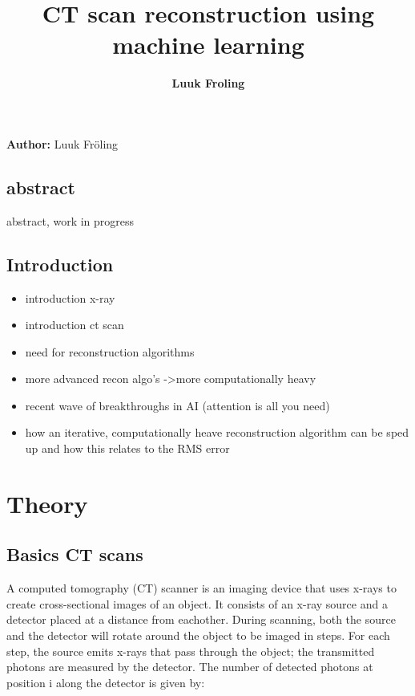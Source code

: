 \documentclass{article}
\title{CT scan reconstruction using machine learning}
\date{\displaydate{articleDate}}
\author{\bfseries Luuk Froling\mdseries\\}
\begin{document}
\maketitle
{}

\textbf{Author:} Luuk Fröling

\subsection{abstract}

abstract, work in progress

\subsection{Introduction}

\begin{itemize}
\item introduction x-ray
\item introduction ct scan
\item need for reconstruction algorithms
\item more advanced recon algo's -\textgreater  more computationally heavy
\item recent wave of breakthroughs in AI (attention is all you need)
\item how an iterative, computationally heave reconstruction algorithm can be sped up and how this relates to the RMS error
\end{itemize}

\section{Theory}

\subsection{Basics CT scans}

A computed tomography (CT) scanner is an imaging device that uses x-rays to create cross-sectional images of an object. It consists of an x-ray source and a detector placed at a distance from eachother. During scanning, both the source and the detector will rotate around the object to be imaged in steps. For each step, the source emits x-rays that pass through the object; the transmitted photons are measured by the detector. The number of detected photons at position i along the detector is given by:
\end{document}
